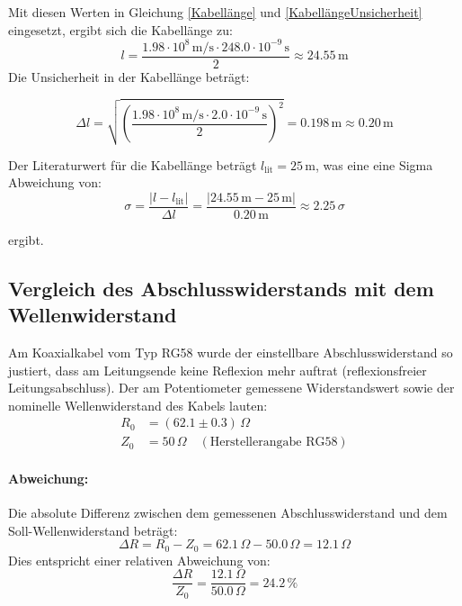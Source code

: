 \documentclass[12pt,a4paper,titlepage]{scrartcl}
\numberwithin{equation}{section}
\numberwithin{table}{section}
\numberwithin{figure}{section}
\begin{document}
Mit diesen Werten in Gleichung \ref{Kabellänge} und \ref{KabellängeUnsicherheit} eingesetzt, ergibt sich die Kabellänge zu:
\begin{equation}
    l = \frac{1.98 \cdot 10^8\,\text{m/s} \cdot 248.0 \cdot 10^{-9}\,\text{s}}{2} \approx 24.55\,\text{m}
\end{equation}
Die Unsicherheit in der Kabellänge beträgt:

\begin{equation}
    \Delta l = \sqrt{\left(\frac{1.98 \cdot 10^8\,\text{m/s} \cdot 2.0 \cdot 10^{-9}\,\text{s}}{2}\right)^2} = 0.198\,\text{m} \approx 0.20\,\text{m}
\end{equation}  

Der Literaturwert für die Kabellänge beträgt $l_\text{lit} = 25\,\text{m}$, was eine eine Sigma Abweichung von:
\begin{equation}
    \sigma = \frac{|l - l_\text{lit}|}{\Delta l} = \frac{|24.55\,\text{m} - 25\,\text{m}|}{0.20\,\text{m}} \approx 2.25\,\sigma
\end{equation}

ergibt.

\subsection{Vergleich des Abschlusswiderstands mit dem Wellenwiderstand}
Am Koaxialkabel vom Typ RG58 wurde der einstellbare Abschlusswiderstand so justiert, dass am Leitungsende keine Reflexion mehr auftrat (reflexionsfreier Leitungsabschluss). Der am Potentiometer gemessene Widerstandswert sowie der nominelle Wellenwiderstand des Kabels lauten:
\begin{align*}
    R_0 &= (62.1 \pm 0.3)\,\Omega \\
    Z_0 &= 50\,\Omega \quad (\text{Herstellerangabe RG58})
\end{align*}

\paragraph{Abweichung:}
Die absolute Differenz zwischen dem gemessenen Abschlusswiderstand und dem Soll-Wellenwiderstand beträgt:
\begin{equation}
    \Delta R = R_0 - Z_0 = 62.1\,\Omega - 50.0\,\Omega = 12.1\,\Omega
\end{equation}
Dies entspricht einer relativen Abweichung von:
\begin{equation}
    \frac{\Delta R}{Z_0} = \frac{12.1\,\Omega}{50.0\,\Omega} = 24.2\,\%
\end{equation}
\end{document}
